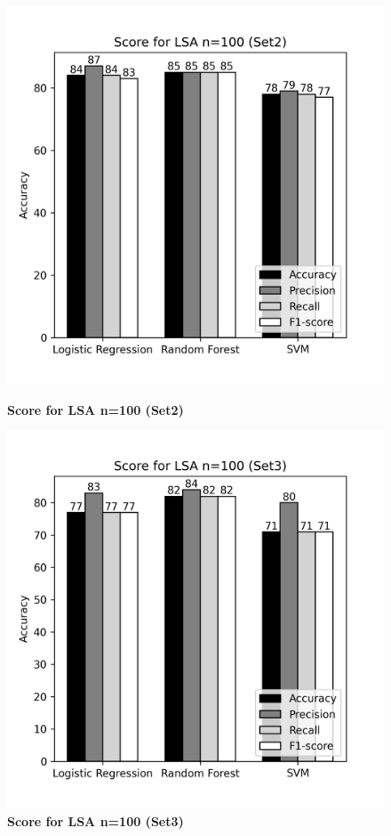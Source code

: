 \documentclass[12pt]{report}
\begin{document}
             \begin{figure}[h]
                \begin{minipage}{0.48\textwidth}
                  \centering
                  \includegraphics[scale=0.55]{plots/Score for LSA n=100 (Set2).png}
                  \caption{\textbf{Score for LSA n=100 (Set2)}}\label{Fig:typo1}
                \end{minipage}\hfill
                \begin{minipage}{0.48\textwidth}
                  \centering
                  \includegraphics[scale=0.55]{plots/Score for LSA n=100 (Set3).png}
                  \caption{\textbf{Score for LSA n=100 (Set3)}}\label{Fig:typo2}
                \end{minipage}
             \end{figure}
\end{document}
